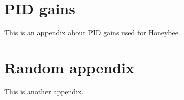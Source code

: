 \chapter{PID gains}
\makeatletter{}\makeatother
\label{appen:pid_gains}

This is an appendix about \gls{PID} gains used for Honeybee.

\chapter{Random appendix}
\makeatletter{}\makeatother
\label{appen:random}

This is another appendix.
